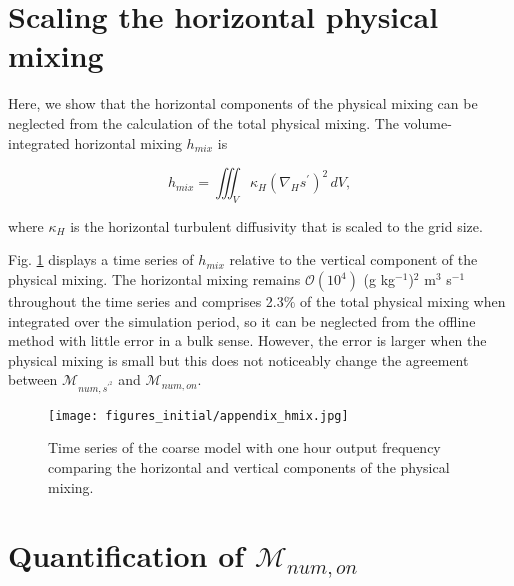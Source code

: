 \documentclass[draft]{agujournal2019}
\begin{document}
\section{Scaling the horizontal physical mixing} \label{Appendix:scaling}

Here, we show that the horizontal components of the physical mixing can be neglected from the calculation of the total physical mixing. The volume-integrated horizontal mixing $h_{mix}$ is
\begin{linenomath*}
\begin{equation}
     h_{mix} = \iiint_V \kappa_H (\nabla_H s^{\prime})^2 \, dV,
\end{equation}
\end{linenomath*}
where $\kappa_H$ is the horizontal turbulent diffusivity that is scaled to the grid size.

Fig. \ref{fig:appendix_hmix} displays a time series of $h_{mix}$ relative to the vertical component of the physical mixing. The horizontal mixing remains $\mathcal{O}(10^4)$ (g kg$^{-1}$)$^2$ m$^3$ s$^{-1}$ throughout the time series and comprises 2.3$\%$ of the total physical mixing when integrated over the simulation period, so it can be neglected from the offline method with little error in a bulk sense. However, the error is larger when the physical mixing is small but this does not noticeably change the agreement between $\mathcal{M}_{num, s^{\prime^2}}$ and $\mathcal{M}_{num, on}$.

\begin{figure}[t]
 \centerline{\texttt{[image: figures\_initial/appendix\_hmix.jpg]}}
  \caption{Time series of the coarse model with one hour output frequency comparing the horizontal and vertical components of the physical mixing. }
  \label{fig:appendix_hmix}
\end{figure}
\newpage

\section{Quantification of $\mathcal{M}_{num, on}$} \label{Appendix:Mnum}
\end{document}
